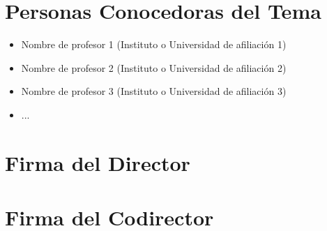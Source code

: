 \documentclass[12pt]{article}
\begin{document}
\section{Personas Conocedoras del Tema}


\begin{itemize}
	\item Nombre de profesor 1 (Instituto o Universidad de afiliaci\'on 1)
	\item Nombre de profesor 2 (Instituto o Universidad de afiliaci\'on 2)
	\item Nombre de profesor 3 (Instituto o Universidad de afiliaci\'on 3)
	\item ...
\end{itemize}


\begin{thebibliography}{10}


\end{thebibliography}

\section*{Firma del Director}
\vspace{1.5cm}

\section*{Firma del Codirector	}
\end{document}
